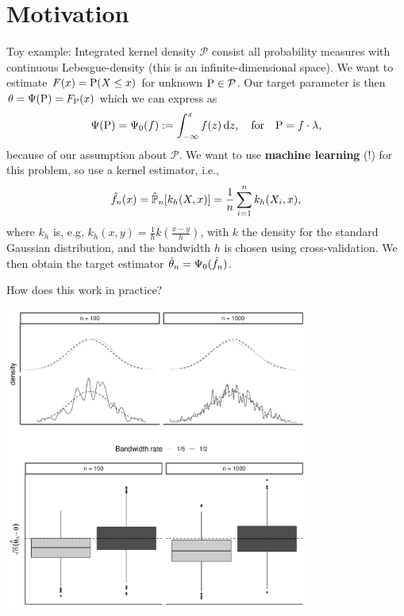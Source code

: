\documentclass{beamer}\usepackage{listings}
\begin{document}
\section{Motivation}
\label{sec:org6d8155b}
\begin{frame}[label={sec:org3a26625}]{Toy example: Integrated kernel density}
$\mathcal{P}$ consist all probability measures with continuous Lebesgue-density (this is an
infinite-dimensional space). We want to estimate $F(x) = \P(X \leq x)$ for unknown
$\P \in \mathcal{P}$. \pause Our target parameter is then $\theta = \TT(\P) = F_{\P}(x)$ which we
can express as
\begin{equation*}
  \TT(\P) = \TT_0(f) := \int_{-\infty}^x f(z) \diff z, \quad \text{for} \quad \P = f \cdot \leb,
\end{equation*}
because of our assumption about $\mathcal{P}$. \pause We want to use \textbf{machine learning} (!) for this problem,
so use a kernel estimator, i.e.,
\begin{equation*}
  \hat{f}_n(x) = \empmeas[k_h(X, x)] = \frac{1}{n}\sum_{i=1}^{n}k_h(X_i, x),
\end{equation*}
where $k_h$ is, e.g, $k_h(x,y) = \frac{1}{h}k\left( \frac{x-y}{h} \right)$, with $k$ the density for the
standard Gaussian distribution, and the bandwidth $h$ is chosen using cross-validation. \pause We
then obtain the target estimator $\hat{\theta}_n = \TT_0(\hat{f}_n)$.
\end{frame}

\begin{frame}[label={sec:org72c936e}]{How does this work in practice?}
\pause
\begin{center}
\includegraphics[width=0.75\textwidth]{./figures/kernel-undersmooth-viz-presentation-3.pdf}
\end{center}
\end{frame}
\end{document}
